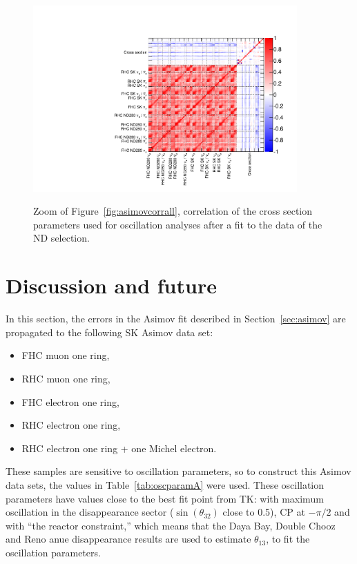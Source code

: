 \begin{figure}[ht]
  \begin{center}
    \includegraphics[width=0.9\textwidth,page=2]{images/BANFF/OutputData_matrices.pdf}\\
    \caption[Correlation of the cross section parameters used for
    oscillation analyses after a fit to the data of the ND280
    selection]{Zoom of Figure~\ref{fig:asimovcorrall}, correlation of
      the cross section parameters used for oscillation analyses after
      a fit to the data of the \Gls{ND} selection.}
    \label{fig:datacorrxsec}
  \end{center}
\end{figure}

\clearpage
\section{Discussion and future}
\label{sec:discussion}
In this section, the errors in the \Gls{Asimov} fit described in
Section~\ref{sec:asimov} are propagated to the following \Gls{SK}
\Gls{Asimov} data set:
\begin{itemize}[noitemsep,topsep=0pt]
\item \Gls{FHC} muon one ring,
\item \Gls{RHC} muon one ring,
\item \Gls{FHC} electron one ring,
\item \Gls{RHC} electron one ring,
\item \Gls{RHC} electron one ring + one Michel electron.
\end{itemize}
These samples are sensitive to oscillation parameters, so to construct
this \Gls{Asimov} data sets, the values in Table~\ref{tab:oscparamA}
were used. These oscillation parameters have values close to the best
fit point from \Gls{TK}: with maximum oscillation in the disappearance
sector ($\sin(\theta_{32})$ close to 0.5), \Gls{CP} at $-\pi/2$ and
with ``the reactor constraint,'' which means that the Daya Bay, Double
Chooz and Reno \Gls{anue} disappearance results are used to estimate
$\theta_{13}$, to fit the oscillation parameters.

